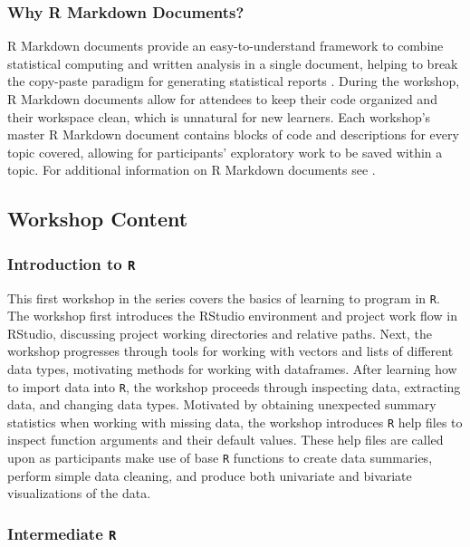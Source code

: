 \documentclass[12pt]{article}
\begin{document}
\subsubsection{Why R Markdown Documents?}

\quad R Markdown documents provide an easy-to-understand framework to combine
statistical computing and written analysis in a single document, helping to
break the copy-paste paradigm for generating statistical reports 
\citep{mine-rmarkdown}. During the workshop, R Markdown documents allow for 
attendees to keep their code organized and their workspace clean, which is
unnatural for new learners. Each workshop's master R Markdown document contains
blocks of code and descriptions for every topic covered, allowing for
participants' exploratory work to be saved within a topic. For additional
information on R Markdown documents see \citeauthor{mine-rmarkdown}. 

\subsection{Workshop Content}

\subsubsection{Introduction to \texttt{R}}
\label{sec:introR}

\quad This first workshop in the series covers the basics of learning to program
in \texttt{R}. The workshop first introduces the RStudio environment and project
work flow in RStudio, discussing project working directories and relative paths.
Next, the workshop progresses through tools for working with vectors and lists 
of different data types, motivating methods for working with dataframes. After
learning how to import data into \texttt{R}, the workshop proceeds through
inspecting data, extracting data, and changing data types. Motivated by
obtaining unexpected summary statistics when working with missing data, the
workshop introduces \texttt{R} help files to inspect function arguments and
their default values. These help files are called upon as participants make use 
of base \texttt{R} functions to create data summaries, perform simple data
cleaning, and produce both univariate and bivariate visualizations of the data. 

\subsubsection{Intermediate \texttt{R}}
\label{sec:intermed}
\end{document}
